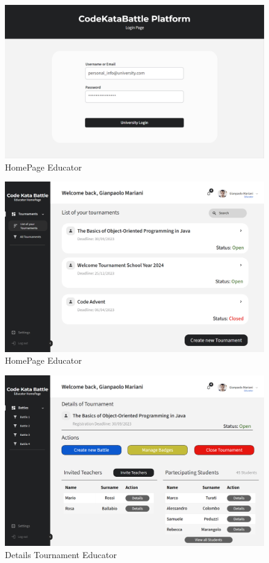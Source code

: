 
\begin{figure}[H]
    \centering
    \includegraphics[width=\textwidth]{../images/login.png}
    \caption{HomePage Educator}
    \label{fig:HomePage Educator}
\end{figure}
\begin{figure}[H]
    \centering
    \includegraphics[width=\textwidth]{../images/homepage-educator.png}
    \caption{HomePage Educator}
    \label{fig:HomePage Educator}
\end{figure}
\begin{figure}[H]
    \centering
    \includegraphics[width=\textwidth]{../images/details-tournament-educator.png}
    \caption{Details Tournament Educator}
    \label{fig:Details Tournament Educator}
\end{figure}
